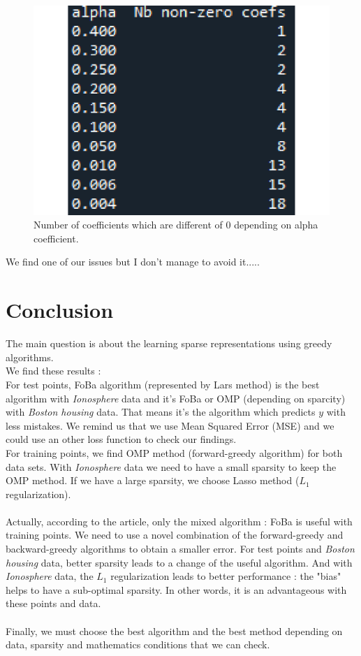 \documentclass{article}
\begin{document}
\begin{itemize}
\begin{figure}[!ht]
    \includegraphics[scale=0.2]{./images/nb_non_zero_ionosphere.pdf}
    \caption{Number of coefficients which are different of $0$ depending on alpha coefficient.}
\end{figure}
\end{itemize}
We find one of our issues but I don't manage to avoid it.....
\newpage

\section*{Conclusion}
The main question is about the learning sparse representations using greedy algorithms.\\
We find these results :\\
For test points, FoBa algorithm (represented by Lars method) is the best algorithm with \textit{Ionosphere} data and it's FoBa or OMP (depending on sparcity) with \textit{Boston housing} data. That means it's the algorithm which predicts $y$ with less mistakes. We remind us that we use Mean Squared Error (MSE) and we could use an other loss function to check our findings.\\
For training points, we find OMP method (forward-greedy algorithm) for both data sets. With \textit{Ionosphere} data we need to have a small sparsity to keep the OMP method. If we have a large sparsity, we choose Lasso method ($L_1$ regularization).\\
\\
Actually, according to the article, only the mixed algorithm : FoBa is useful with training points. We need to use a novel combination of the forward-greedy and backward-greedy algorithms to obtain a smaller error. For test points and \textit{Boston housing} data, better sparsity leads to a change of the useful algorithm. And with \textit{Ionosphere} data, the $L_1$ regularization leads to better performance : the "bias" helps to have a sub-optimal sparsity. In other words, it is an advantageous with these points and data. \\
\\
Finally, we must choose the best algorithm and the best method depending on data, sparsity and mathematics conditions that we can check.
\end{document}
